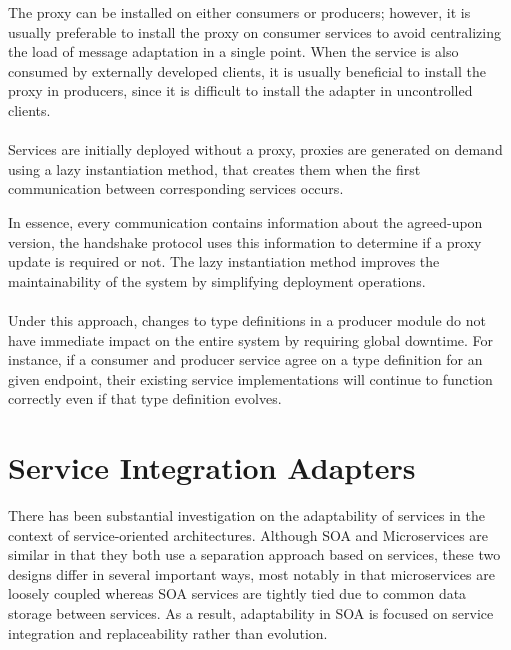 The proxy can be installed on either consumers or producers;
however, it is usually preferable to install the proxy on consumer services to avoid centralizing the load of message adaptation in a single point.
When the service is also consumed by externally developed clients,
it is usually beneficial to install the proxy in producers, since it is difficult to install the adapter in uncontrolled clients.

\paragraph{}

Services are initially deployed without a proxy, proxies are generated on demand using a lazy instantiation method, that creates them when the first communication between corresponding services occurs.

In essence, every communication contains information about the agreed-upon version, the handshake protocol uses this information to determine if a proxy update is required or not.
The lazy instantiation method improves the maintainability of the system by
simplifying deployment operations.

\paragraph{}

Under this approach, changes to type definitions in a producer module do not have immediate impact on the entire system by requiring global downtime.
For instance, if a consumer and producer service agree on a type definition for an given endpoint,
their existing service implementations will continue to function correctly even if that type definition evolves.

\section{Service Integration Adapters} %
\label{sec:service_integration_adapters}

There has been substantial investigation on the adaptability of services in the context of service-oriented architectures.
Although SOA \cite{7} and Microservices \cite{14} are similar in that they both use a separation approach based on services,
these two designs differ in several important ways, most notably in that microservices are loosely coupled whereas SOA services are tightly tied due to common data storage between services.
As a result, adaptability in SOA is focused on service integration and replaceability rather than evolution.

